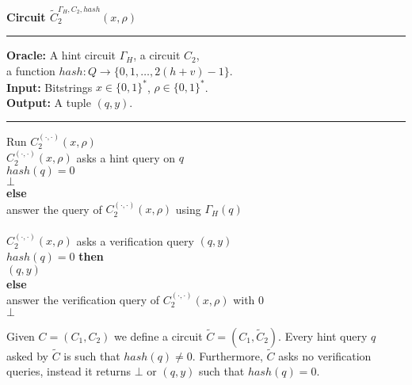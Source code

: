 %
\begin{codeblock}
  \textbf{Circuit $\widetilde{C}_2^{\Gamma_H, C_2, hash} (x, \rho)$}
  \medskip \hrule \medskip
  \textbf{Oracle:} A hint circuit $\Gamma_H$, a circuit $C_2$, \\
  \IndII a function $hash : Q \rightarrow \{0,1,\dots, 2(h+v)-1\}$. \\
  \textbf{Input:} Bitstrings $x \in \{0,1\}^{*}$, $\rho \in \{0,1\}^{*}$. \\
  \textbf{Output:} A tuple $(q, y)$.
  \medskip\hrule\medskip
  Run $C_2^{(\cdot, \cdot)}(x, \rho)$ \\
  \IndI \If $C_2^{(\cdot, \cdot)}(x, \rho)$ asks a hint query on $q$ \Then\\
  \IndII \If $hash(q) = 0$ \Then\\
  \IndIII \Return $\bot$\\
  \IndII \textbf{else}\\
  \IndIII answer the query of $C_2^{(\cdot, \cdot)}(x, \rho)$ using $\Gamma_H(q)$\\
  \\
  \IndI \If $C_2^{(\cdot, \cdot)}(x, \rho)$ asks a verification query $(q, y)$ \Then \\
  \IndII \If $hash(q) = 0 $ \textbf{then} \\
  \IndIII \Return $(q, y)$ \\
  \IndII \textbf{else} \\
  \IndIII answer the verification query of $C_2^{(\cdot, \cdot)}(x, \rho)$ with 0 \\
  \Return $\bot$
\end{codeblock}
%
Given $C = (C_1, C_2)$ we define a circuit $\widetilde{C} = (C_1, \widetilde{C}_2)$.
Every hint query $q$ asked by $\widetilde{C}$ is such that $hash(q) \neq 0$.
Furthermore, $\widetilde{C}$ asks no verification queries, instead it returns $\bot$ or $(q,y)$ such that
$hash(q) = 0$.

